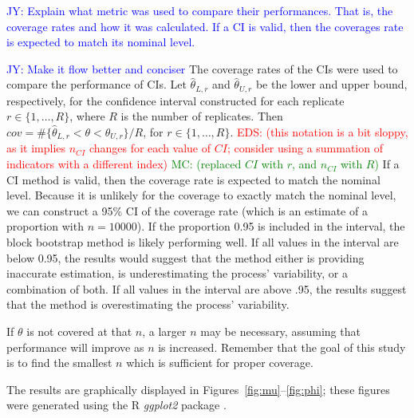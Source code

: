 \documentclass[12pt, letterpaper, titlepage]{article}
\newcommand{\jy}[1]{\textcolor{blue}{JY: #1}}
\newcommand{\eds}[1]{\textcolor{red}{EDS: (#1)}}
\newcommand{\mc}[1]{\textcolor{green}{MC: (#1)}}
\begin{document}
\jy{Explain what metric was used to compare their performances. That is, the
  coverage rates and how it was calculated. If a CI is valid, then the coverages
  rate is expected to match its nominal level.}

\jy{Make it flow better and conciser}
The coverage rates of the CIs were used to compare the performance of CIs. Let
$\hat\theta_{L, r}$ and $\hat\theta_{U, r}$ be the lower and upper bound,
respectively, for the confidence interval constructed for each replicate
$r \in \{1, \ldots, R\}$, where $R$ is the
number of replicates.
Then $cov = \#\{\hat\theta_{L, r} < \theta < \hat\theta_{U, r} \}/R$,  
for $r \in \{1, \ldots, R\}$.
\eds{this notation is a bit sloppy, as it implies $n_{CI}$ changes for each 
value of $CI$; consider using a summation of indicators with a different index}
\mc{replaced $CI$ with $r$, and $n_{CI}$ with $R$}
If a CI method is valid, then the coverage rate is expected to match the
nominal 
level. Because it is unlikely for the coverage to exactly match the nominal
level,
we can construct a 95\% CI of the coverage
rate (which is an estimate of a proportion with $n = 10000$). If the proportion
0.95 is included in the interval, the block bootstrap method is likely
performing
well. If all values in the interval are below 0.95, the results would suggest 
that the
method either is providing inaccurate estimation, is underestimating the
process' variability, or a combination of both. If all values in the interval
are above .95, the results suggest that the method is overestimating the
process' variability.

If $\theta$ is not covered at that $n$, a larger $n$ may be
necessary, assuming that performance will improve as $n$ is increased.
Remember that
the goal of this study is to find the smallest $n$ which is sufficient for
proper coverage.




The results are graphically displayed in Figures~\ref{fig:mu}--\ref{fig:phi};
these figures were generated using the R \textsl{ggplot2} package
\citep{ggplot2}.
\end{document}
